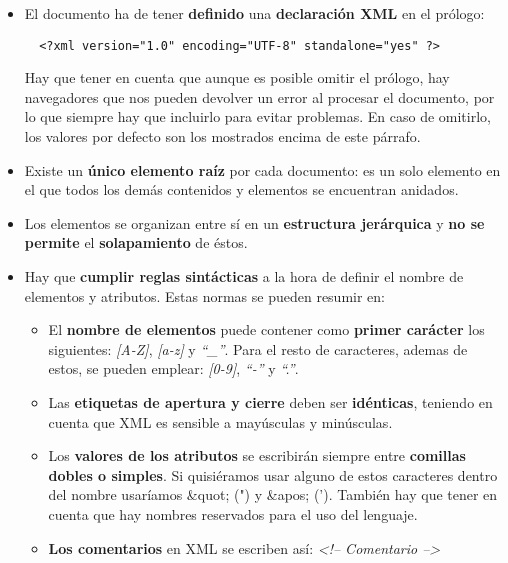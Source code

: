 \begin{itemize}
    \item El documento ha de tener \textbf{definido} una \textbf{declaración XML} en el prólogo:

    \begin{tcolorbox}[sharp corners, colback=yellow!40, colframe=white!20]
        \begin{verbatim}  <?xml version="1.0" encoding="UTF-8" standalone="yes" ?>\end{verbatim}
    \end{tcolorbox}

    Hay que tener en cuenta que aunque es posible omitir el prólogo, hay navegadores que nos pueden devolver un error al procesar el documento, por lo que siempre hay que incluirlo para evitar problemas. En caso de omitirlo, los valores por defecto son los mostrados encima de este párrafo.

    \item Existe un \textbf{único elemento raíz} por cada documento: es un solo elemento en el que todos los demás contenidos y elementos se encuentran anidados.
    \item Los elementos se organizan entre sí en un \textbf{estructura jerárquica} y \textbf{no se permite} el \textbf{solapamiento} de éstos.
    \item Hay que \textbf{cumplir reglas sintácticas} a la hora de definir el nombre de elementos y atributos. Estas normas se pueden resumir en:
    \begin{itemize}
        \item El \textbf{nombre de elementos} puede contener como \textbf{primer carácter} los siguientes: \textit{[A-Z]},  \textit{[a-z]} y \textit{``\_''}. Para el resto de caracteres, ademas de estos, se pueden emplear: \textit{[0-9]}, \textit{``-''} y \textit{``.''}.
        \item Las \textbf{etiquetas de apertura y cierre} deben ser \textbf{idénticas}, teniendo en cuenta que XML es sensible a mayúsculas y minúsculas.
        \item Los \textbf{valores de los atributos} se escribirán siempre entre \textbf{comillas dobles o simples}. Si quisiéramos usar alguno de estos caracteres dentro del nombre usaríamos \&quot; (") y \&apos; ('). También hay que tener en cuenta que hay nombres reservados para el uso del lenguaje.
        \item \textbf{Los comentarios} en XML se escriben así: \textit{ <!-- Comentario -->}
    \end{itemize}
\end{itemize}

